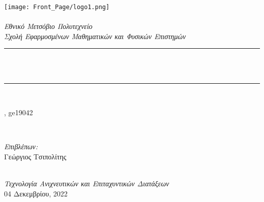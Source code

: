 \begin{titlepage}




\newcommand{\HRule}{\rule{\linewidth}{0.5mm}}
\texttt{[image: Front\_Page/logo1.png]}\\[1cm] 
\center 
\quad\\[1.5cm]
\textsl{\Large Εθνικό Μετσόβιο Πολυτεχνείο}\\[0.5cm] 
\textsl{\large Σχολή Εφαρμοσμένων Μαθηματικών και Φυσικών Επιστημών}\\[0.5cm] 
\makeatletter
\HRule \\[0.4cm]
{ \huge \bfseries \@title}\\[0.4cm] 
\HRule \\[1.5cm]
\begin{minipage}{0.4\textwidth}
\begin{flushleft} \large
\@author, ge19042
\end{flushleft}
\end{minipage}
~
\begin{minipage}{0.4\textwidth}
\begin{flushright} \large
\emph{Επιβλέπων:} \\
\textup{Γεώργιος Τσιπολίτης}
\end{flushright}
\end{minipage}\\[3cm]
\makeatother
{\large \emph{Τεχνολογία Ανιχνευτικών και Επιταχυντικών Διατάξεων}}\\[0.5cm]
{\large 04 Δεκεμβρίου, 2022}
\vfill 



\end{titlepage}
